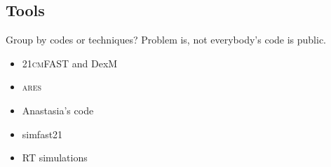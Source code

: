 \subsection{Tools}
Group by codes or techniques? Problem is, not everybody's code is public.
\begin{itemize}
	\item \textsc{21cmFAST} and DexM
	\item \textsc{ares}
	\item Anastasia's code
	\item simfast21
	\item RT simulations
\end{itemize}






